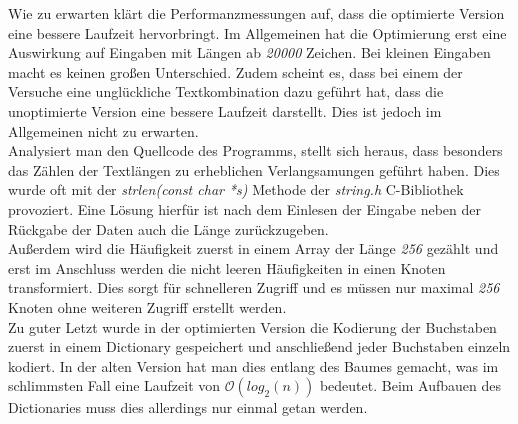 \documentclass[course=erap]{aspdoc}
\begin{document}
\begin{center}
\end{center}
Wie zu erwarten klärt die Performanzmessungen auf, dass die optimierte Version eine bessere Laufzeit hervorbringt. Im Allgemeinen hat die Optimierung erst eine Auswirkung auf Eingaben mit Längen ab \textit{20000} Zeichen. Bei kleinen Eingaben macht es keinen großen Unterschied. Zudem scheint es, dass bei einem der Versuche eine unglückliche Textkombination dazu geführt hat, dass die unoptimierte Version eine bessere Laufzeit darstellt. Dies ist jedoch im Allgemeinen nicht zu erwarten.\\
Analysiert man den Quellcode des Programms, stellt sich heraus, dass besonders das Zählen der Textlängen zu erheblichen Verlangsamungen geführt haben. Dies wurde oft mit der \textit{strlen(const char *s)} Methode der \textit{string.h} C-Bibliothek provoziert. Eine Lösung hierfür ist nach dem Einlesen der Eingabe neben der Rückgabe der Daten auch die Länge zurückzugeben.\\
Außerdem wird die Häufigkeit zuerst in einem Array der Länge \textit{256} gezählt und erst im Anschluss werden die nicht leeren Häufigkeiten in einen Knoten transformiert. Dies sorgt für schnelleren Zugriff und es müssen nur maximal \textit{256} Knoten ohne weiteren Zugriff erstellt werden.\\
Zu guter Letzt wurde in der optimierten Version die Kodierung der Buchstaben zuerst in einem Dictionary gespeichert und anschließend jeder Buchstaben einzeln kodiert. In der alten Version hat man dies entlang des Baumes gemacht, was im schlimmsten Fall eine Laufzeit von $\mathcal{O}(log_2(n))$ bedeutet. Beim Aufbauen des Dictionaries muss dies allerdings nur einmal getan werden.\\
\end{document}

